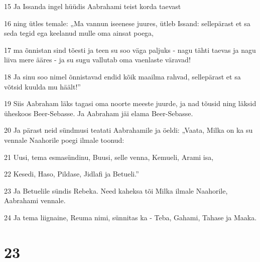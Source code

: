 \par 15 Ja Issanda ingel hüüdis Aabrahami teist korda taevast
\par 16 ning ütles temale: „Ma vannun iseenese juures, ütleb Issand: sellepärast et sa seda tegid ega keelanud mulle oma ainsat poega,
\par 17 ma õnnistan sind tõesti ja teen su soo väga paljuks - nagu tähti taevas ja nagu liiva mere ääres - ja su sugu vallutab oma vaenlaste väravad!
\par 18 Ja sinu soo nimel õnnistavad endid kõik maailma rahvad, sellepärast et sa võtsid kuulda mu häält!”
\par 19 Siis Aabraham läks tagasi oma noorte meeste juurde, ja nad tõusid ning läksid üheskoos Beer-Sebasse. Ja Aabraham jäi elama Beer-Sebasse.
\par 20 Ja pärast neid sündmusi teatati Aabrahamile ja öeldi: „Vaata, Milka on ka su vennale Naahorile poegi ilmale toonud:
\par 21 Uusi, tema esmasündinu, Buusi, selle venna, Kemueli, Arami isa,
\par 22 Kesedi, Haso, Pildase, Jidlafi ja Betueli.”
\par 23 Ja Betuelile sündis Rebeka. Need kaheksa tõi Milka ilmale Naahorile, Aabrahami vennale.
\par 24 Ja tema liignaine, Reuma nimi, sünnitas ka - Teba, Gahami, Tahase ja Maaka.

\chapter{23}


